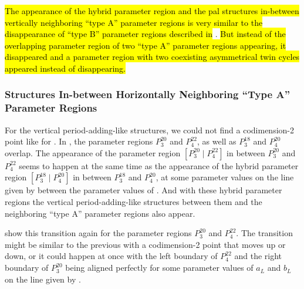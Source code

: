 \hl{The appearance of the hybrid parameter region and the \gls{pal} structures in-between vertically neighboring ``type A'' parameter regions is very similar to the disappearance of ``type B'' parameter regions described in} .
\hl{
	But instead of the overlapping parameter region of two ``type A'' parameter regions appearing, it disappeared and a parameter region with two coexisting asymmetrical twin cycles appeared instead of disappearing.
}

\subsubsection{ Structures In-between Horizontally Neighboring ``Type A'' Parameter Regions}
\label{sec:add.change.appa.vert}

For the vertical period-adding-like structures, we could not find a codimension-2 point like for .
In , the parameter regions $P^{20}_3$ and $P^{22}_4$, as well as $P^{18}_3$ and $P^{20}_4$ overlap.
The appearance of the parameter region $\left[P^{20}_3 \mid P^{22}_4\right]$ in between $P^{20}_3$ and $P^{22}_4$ seems to happen at the same time as the appearance of the hybrid parameter region $\left[P^{18}_3 \mid P^{20}_4\right]$ in between $P^{18}_3$ and $P^{20}_4$, at some parameter values on the line given by  between the parameter values of .
And with these hybrid parameter regions the vertical period-adding-like structures between them and the neighboring ``type A'' parameter regions also appear.

 show this transition again for the parameter regions $P^{20}_3$ and $P^{22}_4$.
The transition might be similar to the previous  with a codimension-2 point that moves up or down, or it could happen at once with the left boundary of $P^{22}_4$ and the right boundary of $P^{20}_3$ being aligned perfectly for some parameter values of $a_L$ and $b_L$ on the line given by .

